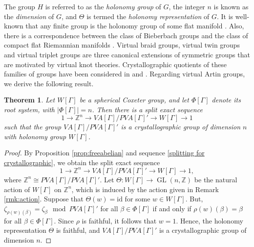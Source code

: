 \documentclass[12pt]{amsart}
\newtheorem{theorem}[equation]{Theorem}
\numberwithin{equation}{section}
\newcommand{\GL}{\operatorname{GL}}
\newcommand{\id}{\mathrm{id}}
\begin{document}
The group $H$ is referred to as the {\it holonomy group} of $G$, the integer $n$ is known as the {\it dimension} of $G$, and $\Theta$ is termed the {\it holonomy representation} of $G$. It is well-known that any finite group is the holonomy group of some flat manifold \cite[Theorem III.5.2]{MR0862114}. Also, there is a correspondence between the class of Bieberbach groups and the class of compact flat Riemannian manifolds \cite[Theorem 2.1.1]{MR1482520}. Virtual braid groups, virtual twin groups and virtual triplet groups are three canonical extensions of symmetric groups that are motivated by virtual knot theories. Crystallographic quotients of these families of groups have been considered in \cite[Theorem 2.4 and Theorem 3.5]{MR4607569} and \cite[Theorem 5.4]{MR4750162}. Regarding virtual Artin groups, we derive the following result.


\begin{theorem}\label{thm crystallographic SVAG}
Let $W[\Gamma]$ be a spherical Coxeter group, and let $\Phi[\Gamma]$ denote its root system, with $|\Phi[\Gamma]|=n$. Then there is a split exact sequence
$$
1 \to \mathbb{Z}^{n} \to VA[\Gamma]/PVA[\Gamma]' \to  W[\Gamma] \to 1
$$
such that the group $VA[\Gamma]/PVA[\Gamma]'$ is a crystallographic group of dimension $n$ with holonomy group $W[\Gamma]$.
\end{theorem}

\begin{proof}
By Proposition \ref{prop:freeabelian} and sequence \eqref{splitting for crystallographic}, we obtain the split exact sequence
$$
1 \to \mathbb{Z}^n \to VA[\Gamma]/PVA[\Gamma]' \to  W[\Gamma] \to 1,
$$
where $\mathbb{Z}^n \cong PVA[\Gamma]/PVA[\Gamma]'$.  Let $\Theta: W[\Gamma] \to \GL(n, \mathbb{Z})$ be the natural action of $W[\Gamma]$ on $\mathbb{Z}^n$, which is induced by the action given in Remark \ref{rmk:action}. Suppose that $\Theta(w)=\id$ for some $w \in W[\Gamma]$. But, $\zeta_{\rho(w)(\beta)} = \zeta_\beta \mod PVA[\Gamma]'$ for all $\beta \in \Phi[\Gamma]$ if and only if  $\rho(w)(\beta)=\beta$ for all $\beta \in \Phi[\Gamma]$. Since $\rho$ is faithful, it follows that $w=1$. Hence, the holonomy representation $\Theta$ is faithful, and $VA[\Gamma]/PVA[\Gamma]'$ is a crystallographic group of dimension $n$.
\end{proof}
\end{document}
